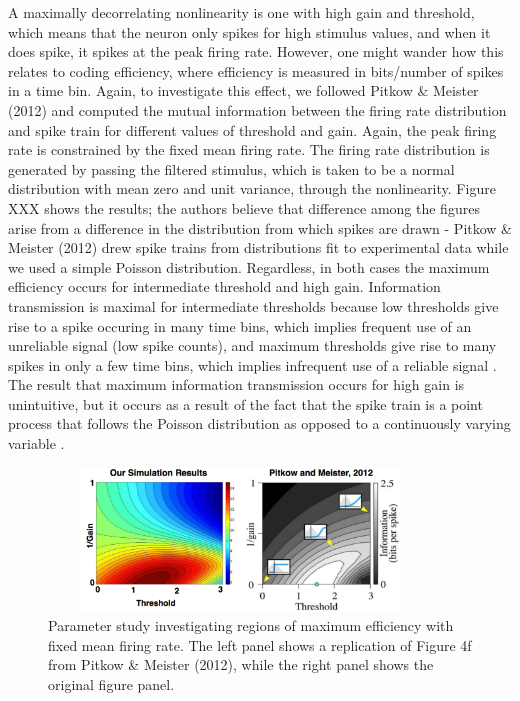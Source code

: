 \documentclass[12pt]{article}
\begin{document}
A maximally decorrelating nonlinearity is one with high gain and threshold, which means that the neuron only spikes for high stimulus values, and when it does spike, it spikes at the peak firing rate. However, one might wander how this relates to coding efficiency, where efficiency is measured in bits/number of spikes in a time bin. Again, to investigate this effect, we followed Pitkow \& Meister (2012) and computed the mutual information between the firing rate distribution and spike train for different values of threshold and gain. Again, the peak firing rate is constrained by the fixed mean firing rate. The firing rate distribution is generated by passing the filtered stimulus, which is taken to be a normal distribution with mean zero and unit variance, through the nonlinearity. Figure XXX shows the results; the authors believe that difference among the figures arise from a difference in the distribution from which spikes are drawn - Pitkow \& Meister (2012) drew spike trains from distributions fit to experimental data while we used a simple Poisson distribution. Regardless, in both cases the maximum efficiency occurs for intermediate threshold and high gain. Information transmission is maximal for intermediate thresholds because low thresholds give rise to a spike occuring in many time bins, which implies frequent use of an unreliable signal (low spike counts), and maximum thresholds give rise to many spikes in only a few time bins, which implies infrequent use of a reliable signal \cite{Pitkow}. The result that maximum information transmission occurs for high gain is unintuitive, but it occurs as a result of the fact that the spike train is a point process that follows the Poisson distribution as opposed to a continuously varying variable \cite{Pitkow}. 


\begin{figure}[h!!]
\centerline{\includegraphics*[height = 1.5in,width=4.0in,angle=0]{ReplicationOf4f.pdf}}
\label{Figure 2}
\caption{Parameter study investigating regions of maximum efficiency with fixed mean firing rate. The left panel shows a replication of Figure 4f from Pitkow \& Meister (2012), while the right panel shows the original figure panel.}
\end{figure}
\end{document}
